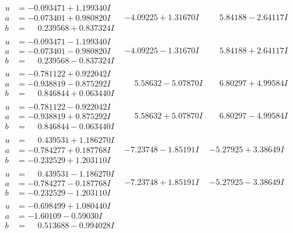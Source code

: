 \documentclass[1p]{elsarticle_modified}
\theoremstyle{definition}
\begin{document}
$$\begin{array}{c|c|c}
\begin{aligned}
u &= -0.093471 + 1.199340 I \\
a &= -0.073401 + 0.980820 I \\
b &= \phantom{-}0.239568 + 0.837324 I\end{aligned}
 & -4.09225 + 1.31670 I & \phantom{-}5.84188 - 2.64117 I \\ \hline\begin{aligned}
u &= -0.093471 - 1.199340 I \\
a &= -0.073401 - 0.980820 I \\
b &= \phantom{-}0.239568 - 0.837324 I\end{aligned}
 & -4.09225 - 1.31670 I & \phantom{-}5.84188 + 2.64117 I \\ \hline\begin{aligned}
u &= -0.781122 + 0.922042 I \\
a &= -0.938819 - 0.875292 I \\
b &= \phantom{-}0.846844 + 0.063440 I\end{aligned}
 & \phantom{-}5.58632 - 5.07870 I & \phantom{-}6.80297 + 4.99584 I \\ \hline\begin{aligned}
u &= -0.781122 - 0.922042 I \\
a &= -0.938819 + 0.875292 I \\
b &= \phantom{-}0.846844 - 0.063440 I\end{aligned}
 & \phantom{-}5.58632 + 5.07870 I & \phantom{-}6.80297 - 4.99584 I \\ \hline\begin{aligned}
u &= \phantom{-}0.439531 + 1.186270 I \\
a &= -0.784277 + 0.187768 I \\
b &= -0.232529 + 1.203110 I\end{aligned}
 & -7.23748 - 1.85191 I & -5.27925 + 3.38649 I \\ \hline\begin{aligned}
u &= \phantom{-}0.439531 - 1.186270 I \\
a &= -0.784277 - 0.187768 I \\
b &= -0.232529 - 1.203110 I\end{aligned}
 & -7.23748 + 1.85191 I & -5.27925 - 3.38649 I \\ \hline\begin{aligned}
u &= -0.698499 + 1.080440 I \\
a &= -1.60109 - 0.59030 I \\
b &= \phantom{-}0.513688 - 0.994028 I\end{aligned}

\end{array}$$
\end{document}
